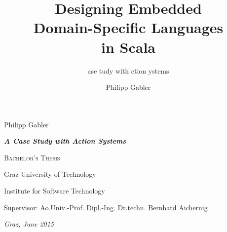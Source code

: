 \documentclass[11pt,a4paper,oneside]{memoir}
\title{Designing Embedded \\ Domain-Specific Languages \\ in Scala}
\subtitle{\upinitial{A}{0pt} \upinitial{C}{-0.8pt}ase %
  \upinitial{S}{-0.8pt}tudy with \upinitial{A}{-0.7pt}ction \upinitial{S}{-1.4pt}ystems}
\author{Philipp Gabler}
\date{}
\newcommand{\upinitial}[2]{{\textup{#1}\kern#2}}
\begin{document}
\pagestyle{simple}
\frontmatter

\begingroup
  \thispagestyle{empty}
  \centering
  \vspace{3cm}
  {\LARGE Philipp Gabler \par}
  \vspace{2cm}
  {\Huge\color{textred}\bfseries \thetitle \par}
  \vspace{0.5cm}
  {\Large\itshape\bfseries \upinitial{A}{0pt} \upinitial{C}{-0.8pt}ase %
    \upinitial{S}{-0.7pt}tudy with \upinitial{A}{-0.6pt}ction \upinitial{S}{-1.4pt}ystems \par}
  \vspace{2.2cm}
  {\Large\scshape Bachelor's Thesis}
  \vfill
  {\large Graz University of Technology \par}
  \vspace{1ex}
  {\large Institute for Software Technology \par}
  \vspace{1cm}
  {Supervisor: Ao.\thinspace{}Univ.-Prof. Dipl.-Ing. Dr.\thinspace{}techn. Bernhard Aichernig \par}
  \vspace{1.1cm}
  {\small\slshape Graz, June 2015 \par}
\endgroup
\end{document}
